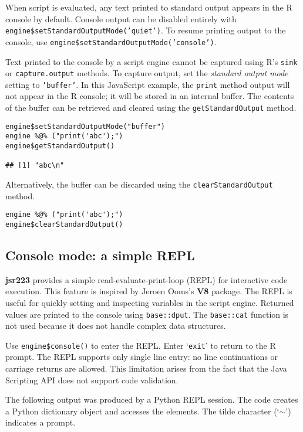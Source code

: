 \documentclass[
article,
11pt, %
a4paper, %
oneside, %
headinclude,footinclude, %
]{scrartcl}
\theoremstyle{definition} %
\theoremstyle{plain} %
\theoremstyle{remark} %
\newcommand{\pkg}[1]{\textbf{#1}}
\newcommand{\code}[1]{\texttt{#1}}
\newcommand{\samp}[1]{{`\normalfont\texttt{#1}'}}
\begin{document}
When script is evaluated, any text printed to standard output appears in the R console by default. Console output can be disabled entirely with \code{engine\$setStandardOutputMode('quiet')}. To resume printing output to the console, use \code{engine\$setStandardOutputMode('console')}.

Text printed to the console by a script engine cannot be captured using R's \code{sink} or \code{capture.output} methods. To capture output, set the \textit{standard output mode} setting to \code{'buffer'}. In this JavaScript example, the \code{print} method output will not appear in the R console; it will be stored in an internal buffer. The contents of the buffer can be retrieved and cleared using the \code{getStandardOutput} method.

\begin{verbatim}
engine$setStandardOutputMode("buffer")
engine %@% ("print('abc');")
engine$getStandardOutput()

## [1] "abc\n"
\end{verbatim}
Alternatively, the buffer can be discarded using the \code{clearStandardOutput} method.
\begin{verbatim}
engine %@% ("print('abc');")
engine$clearStandardOutput()
\end{verbatim}

\subsection{Console mode: a simple REPL}

\pkg{jsr223} provides a simple read-evaluate-print-loop (REPL) for interactive code execution. This feature is inspired by Jeroen Ooms's \pkg{V8} package. The REPL is useful for quickly setting and inspecting variables in the script engine. Returned values are printed to the console using \code{base::dput}. The \code{base::cat} function is not used because it does not handle complex data structures.

Use \code{engine\$console()} to enter the REPL. Enter \samp{exit} to return to the R prompt. The REPL supports only single line entry: no line continuations or carriage returns are allowed. This limitation arises from the fact that the Java Scripting API does not support code validation.

The following output was produced by a Python REPL session. The code creates a Python dictionary object and accesses the elements. The tilde character (\samp{$\sim$}) indicates a prompt.
\end{document}
